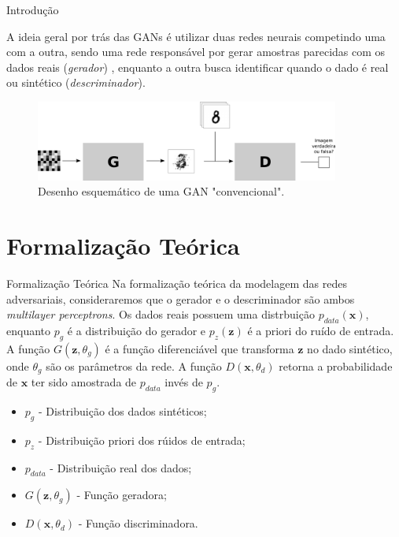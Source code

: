 \documentclass[10pt]{beamer}
\begin{document}
\begin{frame}[fragile]{Introdução}

	A ideia geral por trás das GANs é utilizar duas redes neurais
	competindo uma com a outra, sendo uma rede responsável por
	gerar amostras parecidas com os dados reais (\textit{gerador})
	, enquanto a outra
	busca identificar quando o dado é real ou sintético
	(\textit{descriminador}).

    \begin{figure}[H]
        \centering
        \includegraphics[width=10cm]{images/gan_scheme.png}
        \caption{Desenho esquemático de uma GAN "convencional".}
    \end{figure}

\end{frame}

\AtBeginSection{}
\section[Teoria]{Formalização Teórica}
\begin{frame}[fragile]{Formalização Teórica}
	Na formalização teórica da modelagem das 
	redes adversariais, consideraremos que
	o gerador e o descriminador são ambos \textit{multilayer perceptrons}.
	Os dados reais possuem uma distrbuição
	$p_{data}(\bm x)$, enquanto $p_g$ é a distribuição do gerador e
	$p_z(\bm z)$ é a priori do ruído de entrada. A função
	$G(\bm z, \theta_g)$ é a função diferenciável que transforma $\bm z$ no
	dado sintético, onde $\theta_g$ são os parâmetros da rede.
	A função $D(\bm x, \theta_d)$ retorna a probabilidade de $\bm x$ ter
	sido amostrada de $p_{data}$ invés de $p_g$.
	\begin{itemize}
		\item $p_g$ - Distribuição dos dados sintéticos;
		\item $p_z$ - Distribuição priori dos rúidos de entrada;
		\item $p_{data}$ - Distribuição real dos dados;
		\item $G(\bm z,\theta_g)$ - Função geradora;
		\item $D(\bm x,\theta_d)$ - Função discriminadora.
	\end{itemize}
\end{frame}
\end{document}
